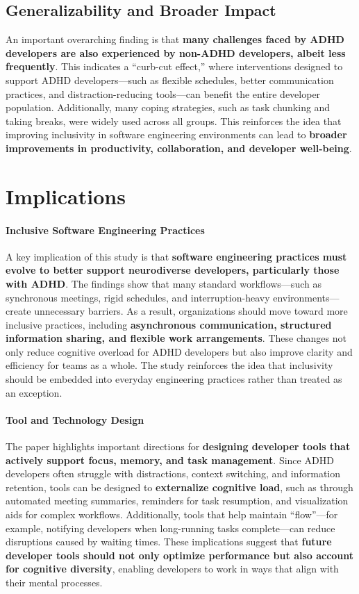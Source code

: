 \subsection{Generalizability and Broader Impact}
An important overarching finding is that \textbf{many challenges faced by ADHD developers are also experienced by non-ADHD developers, albeit less frequently}. This indicates a “curb-cut effect,” where interventions designed to support ADHD developers—such as flexible schedules, better communication practices, and distraction-reducing tools—can benefit the entire developer population. Additionally, many coping strategies, such as task chunking and taking breaks, were widely used across all groups. This reinforces the idea that improving inclusivity in software engineering environments can lead to \textbf{broader improvements in productivity, collaboration, and developer well-being}.

\section{Implications}
\paragraph{Inclusive Software Engineering Practices} A key implication of this study is that \textbf{software engineering practices must evolve to better support neurodiverse developers, particularly those with ADHD}. The findings show that many standard workflows—such as synchronous meetings, rigid schedules, and interruption-heavy environments—create unnecessary barriers. As a result, organizations should move toward more inclusive practices, including \textbf{asynchronous communication, structured information sharing, and flexible work arrangements}. These changes not only reduce cognitive overload for ADHD developers but also improve clarity and efficiency for teams as a whole. The study reinforces the idea that inclusivity should be embedded into everyday engineering practices rather than treated as an exception.

\paragraph{Tool and Technology Design}
The paper highlights important directions for \textbf{designing developer tools that actively support focus, memory, and task management}. Since ADHD developers often struggle with distractions, context switching, and information retention, tools can be designed to \textbf{externalize cognitive load}, such as through automated meeting summaries, reminders for task resumption, and visualization aids for complex workflows. Additionally, tools that help maintain “flow”—for example, notifying developers when long-running tasks complete—can reduce disruptions caused by waiting times. These implications suggest that \textbf{future developer tools should not only optimize performance but also account for cognitive diversity}, enabling developers to work in ways that align with their mental processes.

